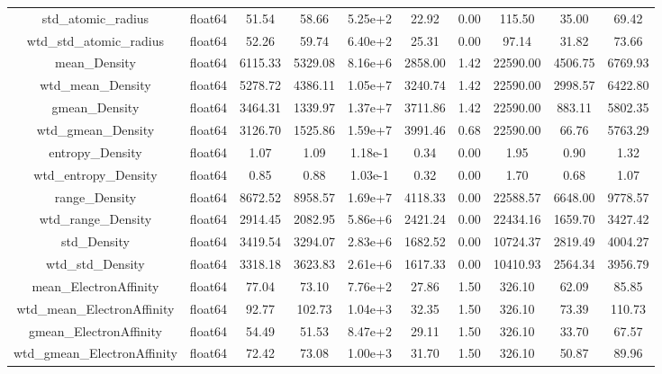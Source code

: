 \documentclass[11pt]{article}
\begin{document}
\begin{table}[H]
{\begin{tabular}{|c|c|c|c|c|c|c|c|c|c|}
std\_atomic\_radius                & float64&    51.54&    58.66&  5.25e+2&    22.92&    0.00&    115.50&    35.00&    69.42 \\
wtd\_std\_atomic\_radius            & float64&    52.26&    59.74&  6.40e+2&    25.31&    0.00&     97.14&    31.82&    73.66 \\
mean\_Density                     & float64&  6115.33&  5329.08&  8.16e+6&  2858.00&    1.42&  22590.00&  4506.75&  6769.93 \\
wtd\_mean\_Density                 & float64&  5278.72&  4386.11&  1.05e+7&  3240.74&    1.42&  22590.00&  2998.57&  6422.80 \\
gmean\_Density                    & float64&  3464.31&  1339.97&  1.37e+7&  3711.86&    1.42&  22590.00&   883.11&  5802.35 \\
wtd\_gmean\_Density                & float64&  3126.70&  1525.86&  1.59e+7&  3991.46&    0.68&  22590.00&    66.76&  5763.29 \\
entropy\_Density                  & float64&     1.07&     1.09&  1.18e-1&     0.34&    0.00&      1.95&     0.90&     1.32 \\
wtd\_entropy\_Density              & float64&     0.85&     0.88&  1.03e-1&     0.32&    0.00&      1.70&     0.68&     1.07 \\
range\_Density                    & float64&  8672.52&  8958.57&  1.69e+7&  4118.33&    0.00&  22588.57&  6648.00&  9778.57 \\
wtd\_range\_Density                & float64&  2914.45&  2082.95&  5.86e+6&  2421.24&    0.00&  22434.16&  1659.70&  3427.42 \\
std\_Density                      & float64&  3419.54&  3294.07&  2.83e+6&  1682.52&    0.00&  10724.37&  2819.49&  4004.27 \\
wtd\_std\_Density                  & float64&  3318.18&  3623.83&  2.61e+6&  1617.33&    0.00&  10410.93&  2564.34&  3956.79 \\
mean\_ElectronAffinity            & float64&    77.04&    73.10&  7.76e+2&    27.86&    1.50&    326.10&    62.09&    85.85 \\
wtd\_mean\_ElectronAffinity        & float64&    92.77&   102.73&  1.04e+3&    32.35&    1.50&    326.10&    73.39&   110.73 \\
gmean\_ElectronAffinity           & float64&    54.49&    51.53&  8.47e+2&    29.11&    1.50&    326.10&    33.70&    67.57 \\
wtd\_gmean\_ElectronAffinity       & float64&    72.42&    73.08&  1.00e+3&    31.70&    1.50&    326.10&    50.87&    89.96 \\

\end{tabular}}
\end{table}
\end{document}
